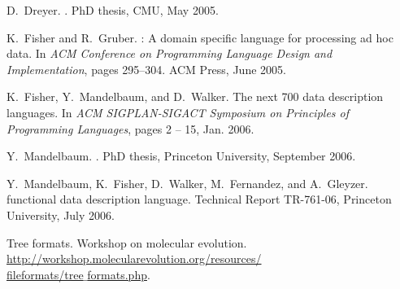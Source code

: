 \documentclass{sigplanconf}
\begin{document}

%
\begin{thebibliography}{1}

D.~Dreyer.
.
\newblock PhD thesis, CMU, May 2005.

K.~Fisher and R.~Gruber.
: A domain specific language for processing ad hoc data.
\newblock In {\em {ACM} Conference on Programming Language Design and
  Implementation}, pages 295--304. {ACM} Press, June 2005.

K.~Fisher, Y.~Mandelbaum, and D.~Walker.
\newblock The next 700 data description languages.
\newblock In {\em {ACM SIGPLAN-SIGACT} Symposium on Principles of Programming
  Languages}, pages 2 -- 15, Jan. 2006.

Y.~Mandelbaum.
.
\newblock PhD thesis, Princeton University, September 2006.

Y.~Mandelbaum, K.~Fisher, D.~Walker, M.~Fernandez, and A.~Gleyzer.
 functional data description language.
\newblock Technical Report TR-761-06, Princeton University, July 2006.

Tree formats. {Workshop} on molecular evolution.
\newblock \url{http://workshop.molecularevolution.org/resources/}\\\noindent
  \url{fileformats/tree}$\_$\url{formats.php}.

\end{thebibliography}
\end{document}
